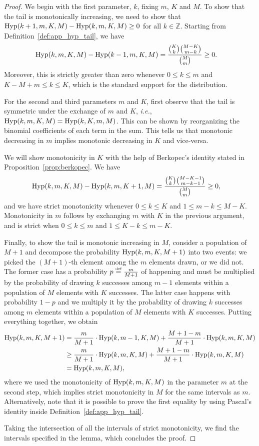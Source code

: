 \documentclass[twoside,11pt]{article}
\newcommand{\ie}{\emph{i.e.\xspace}}
\newcommand{\eqdef}{\overset{\smash{\mbox{\tiny \rm def}}}{=}}
\newcommand{\Hyp}{\textnormal{Hyp}}
\begin{document}
\begin{proof}
We begin with the first parameter, $k$, fixing $m$, $K$ and $M$.
To show that the tail is monotonically increasing, we need to show that $\Hyp(k+1,m,K,M)-\Hyp(k,m,K,M) \geq 0$ for all $k\in \mathds{Z}$. Starting from Definition~\ref{def:app_hyp_tail}, we have
\begin{align*}
    \Hyp(k,m,K,M)-\Hyp(k-1,m,K,M)
    &= \frac{\binom{K}{k}\binom{M-K}{m-k}}{\binom{M}{m}} \ge 0.
\end{align*}
Moreover, this is strictly greater than zero whenever $0 \le k \le m$ and $K-M+m \le k \le K$, which is the standard support for the distribution.

For the second and third parameters $m$ and $K$, first observe that the tail is symmetric under the exchange of $m$ and $K$, \ie, $\Hyp(k,m,K,M) = \Hyp(k,K,m,M)$.
This can be shown by reorganizing the binomial coefficients of each term in the sum.
This tells us that monotonic decreasing in $m$ implies monotonic decreasing in $K$ and vice-versa.

We will show monotonicity in $K$ with the help of Berkopec's identity \citep{berkopec07} stated in Proposition~\ref{prop:berkopec}.
We have
\begin{align*}
    \Hyp(k,m,K,M)-\Hyp(k,m,K+1,M)
    &= \frac{\binom{K}{k} \binom{M-K-1}{m-k-1}}{\binom{M}{m}} \ge 0,
\end{align*}
and we have strict monotonicity whenever $0 \leq k \leq K$ and $1 \le m-k \le M-K$.
Monotonicity in $m$ follows by exchanging $m$ with $K$ in the previous argument, and is strict when $0\le k \le m$ and $1 \le K-k \le m-K$.

Finally, to show the tail is monotonic increasing in $M$, consider a population of $M+1$ and decompose the probability $\Hyp(k,m,K,M+1)$ into two events: we picked the $(M+1)$-th element among the $m$ elements drawn, or we did not.
The former case has a probability $p \eqdef \frac{m}{M+1}$ of happening and must be multiplied by the probability of drawing $k$ successes among $m-1$ elements within a population of $M$ elements with $K$ successes.
The latter case happens with probability $1-p$ and we multiply it by the probability of drawing $k$ successes among $m$ elements within a population of $M$ elements with $K$ successes.
Putting everything together, we obtain
\begin{align*}
    \Hyp(k,m,K,M+1)
    &= \frac{m}{M+1}\cdot \Hyp(k,m-1,K,M) + \frac{M+1-m}{M+1}\cdot\Hyp(k,m,K,M)\\
    &\ge \frac{m}{M+1}\cdot \Hyp(k,m,K,M) + \frac{M+1-m}{M+1}\cdot\Hyp(k,m,K,M)\\
    &= \Hyp(k,m,K,M),
\end{align*}
where we used the monotonicity of $\Hyp(k,m,K,M)$ in the parameter $m$ at the second step, which implies strict monotonicity in $M$ for the same intervals as $m$.
Alternatively, note that it is possible to prove the first equality by using Pascal's identity inside Definition~\ref{def:app_hyp_tail}.

Taking the intersection of all the intervals of strict monotonicity, we find the intervals specified in the lemma, which concludes the proof.
\end{proof}
\end{document}

